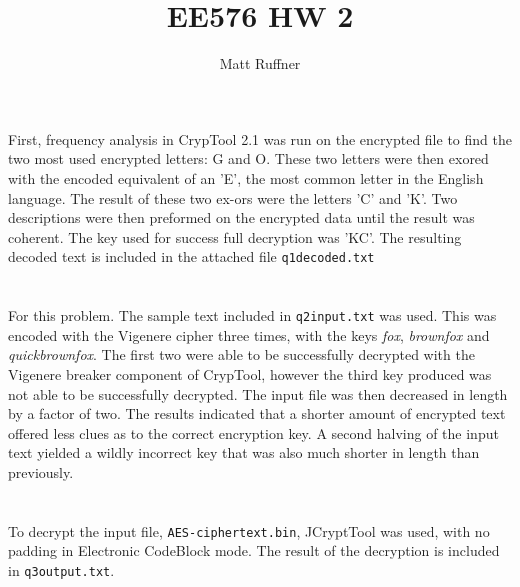 \documentclass[letterpaper]{article}
\title{EE576 HW 2}
\author{Matt Ruffner}
\begin{document}
\maketitle

\section{}
First, frequency analysis in CrypTool 2.1 was run on the encrypted file to find the two most used encrypted letters: G and O. These two letters were then exored with the encoded equivalent of an 'E', the most common letter in the English language. The result of these two ex-ors were the letters 'C' and 'K'. Two descriptions were then preformed on the encrypted data until the result was coherent. The key used for success full decryption was 'KC'. The resulting decoded text is included in the attached file \texttt{q1decoded.txt}

\section{}
For this problem. The sample text included in \texttt{q2input.txt} was used. This was encoded with the Vigenere cipher three times, with the keys \textit{fox}, \textit{brownfox} and \textit{quickbrownfox}. The first two were able to be successfully decrypted with the Vigenere breaker component of CrypTool, however the third key produced was not able to be successfully decrypted. The input file was then decreased in length by a factor of two. The results indicated that a shorter amount of encrypted text offered less clues as to the correct encryption key. A second halving of the input text yielded  a wildly incorrect key that was also much shorter in length than previously.

\section{}
To decrypt the input file, \texttt{AES-ciphertext.bin}, JCryptTool was used, with no padding in Electronic CodeBlock mode. The result of the decryption is included in \texttt{q3output.txt}.
\end{document}
